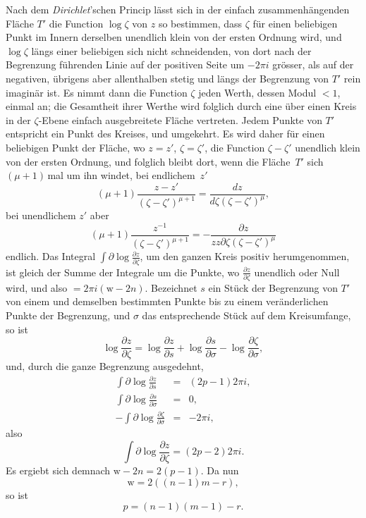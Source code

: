 \documentclass[a4paper,12pt,leqno]{article}
\begin{document}
Nach dem \emph{Dirichlet}'schen Princip l\"{a}sst sich in der
einfach zusammenh\"{a}ngenden Fl\"{a}che $T'$ die Function
$\log \zeta$ von $z$ so bestimmen, dass $\zeta$ f\"{u}r einen
beliebigen Punkt im Innern derselben unendlich klein von der
ersten Ordnung wird, und $\log \zeta$ l\"{a}ngs einer beliebigen
sich nicht schneidenden, von dort nach der Begrenzung
f\"{u}hrenden Linie auf der positiven Seite um $-2\pi i$
gr\"{o}sser, als auf der negativen, \"{u}brigens aber
allenthalben stetig und l\"{a}ngs der Begrenzung von $T'$ rein
imagin\"{a}r ist.  Es nimmt dann die Function $\zeta$ jeden
Werth, dessen Modul $< 1$, einmal an; die Gesamtheit ihrer Werthe
wird folglich durch eine \"{u}ber einen Kreis in der
$\zeta$-Ebene einfach ausgebreitete Fl\"{a}che vertreten.  Jedem
Punkte von $T'$ entspricht ein Punkt des Kreises, und umgekehrt.
Es wird daher f\"{u}r einen beliebigen Punkt der Fl\"{a}che, wo
$z = z'$, $\zeta = \zeta'$, die Function $\zeta - \zeta'$
unendlich klein von der ersten Ordnung, und folglich bleibt dort,
wenn die Fl\"{a}che~$T'$ sich ${(\mu + 1)} \,$\-mal um ihn windet,
bei endlichem~$z'$
\[ (\mu + 1) \frac{z - z'}{(\zeta - \zeta')^{\mu + 1}}
   = \frac{dz}{d\zeta (\zeta - \zeta')^\mu},\]
bei unendlichem $z'$ aber
\[ (\mu + 1) \frac{z^{-1}}{(\zeta - \zeta')^{\mu + 1}}
   = - \frac{\partial z}{z z \partial \zeta (\zeta - \zeta')^\mu} \]
endlich.  Das Integral
$\displaystyle \int \partial \log \frac{\partial z}{\partial \zeta}$,
um den ganzen Kreis positiv herumgenommen, ist gleich der Summe
der Integrale um die Punkte, wo
$\displaystyle \frac{\partial z}{\partial \zeta}$
unendlich oder Null wird, und also $= 2\pi i (\mathrm{w} - 2n)$.
Bezeichnet $s$ ein St\"{u}ck der Begrenzung von $T'$ von einem
und demselben bestimmten Punkte bis zu einem ver\"{a}nderlichen
Punkte der Begrenzung, und $\sigma$ das entsprechende St\"{u}ck
auf dem Kreisumfange, so ist
\[ \log \frac{\partial z}{\partial \zeta}
   =  \log \frac{\partial z}{\partial s}
      + \log \frac{\partial s}{\partial \sigma}
      - \log \frac{\partial \zeta}{\partial \sigma},\]
und, durch die ganze Begrenzung ausgedehnt,
\begin{eqnarray*}
\int \partial \log \frac{\partial z}{\partial s}
   &=& (2p - 1) 2 \pi i,\\
\int \partial \log \frac{\partial s}{\partial \sigma}
   &=& 0,\\
- \int \partial \log \frac{\partial \zeta}{\partial \sigma}
   &=& - 2 \pi i,
\end{eqnarray*}
also
\[ \int \partial \log \frac{\partial z}{\partial \zeta} = (2p - 2) 2 \pi i.\]
Es ergiebt sich demnach $\mathrm{w} - 2n = 2 (p - 1)$.  Da nun
\[ \mathrm{w} = 2 ( (n - 1) m - r ),\]
so ist
\[ p = (n - 1) (m - 1) - r.\]
\end{document}
